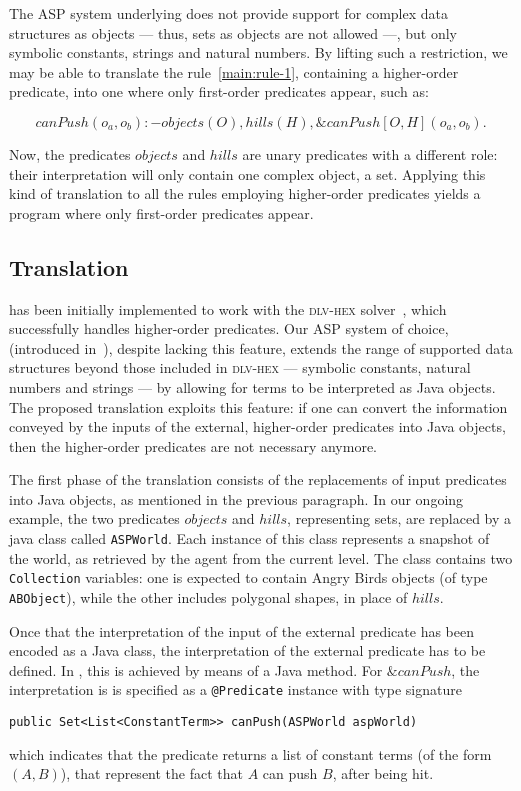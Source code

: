 The ASP system underlying \ah does not provide support for complex data structures as objects --- thus, sets as objects are not allowed ---, but only symbolic constants, strings and natural numbers.
By lifting such a restriction, we may be able to translate the rule~\eqref{main:rule-1}, containing a higher-order predicate, into one where only first-order predicates appear, such as:

$$ canPush(o_a,o_b) :- objects(O), hills(H), \&canPush[O,H](o_a,o_b). \label{main:rule-2} $$

Now, the predicates $objects$ and $hills$ are unary predicates with a different role: their interpretation will only contain one complex object, a set.
Applying this kind of translation to all the rules employing higher-order predicates yields a program where only first-order predicates appear.

\subsection{Translation}

\ah has been initially implemented to work with the \textsc{dlv-hex} solver~\cite{dlvHEX}, which successfully handles higher-order predicates.
Our ASP system of choice, \al (introduced in~\cite{blend}), despite lacking this feature, extends the range of supported data structures beyond those included in \textsc{dlv-hex} --- symbolic constants, natural numbers and strings --- by allowing for terms to be interpreted as Java objects.
The proposed translation exploits this feature: if one can convert the information conveyed by the inputs of the external, higher-order predicates into Java objects, then the higher-order predicates are not necessary anymore.

The first phase of the translation consists of the replacements of input predicates into Java objects, as mentioned in the previous paragraph.
In our ongoing example, the two predicates $objects$ and $hills$, representing sets, are replaced by a java class called \texttt{ASPWorld}.
Each instance of this class represents a snapshot of the world, as retrieved by the agent from the current level.
The class contains two \texttt{Collection} variables: one is expected to contain Angry Birds objects (of type \texttt{ABObject}), while the other includes polygonal shapes, in place of $hills$.

Once that the interpretation of the input of the external predicate has been encoded as a Java class, the interpretation of the external predicate has to be defined.
In \al, this is achieved by means of a Java method.
For $\&canPush$, the interpretation is  is specified as a \texttt{@Predicate} instance with type signature
\begin{center}
    \texttt{public Set<List<ConstantTerm>> canPush(ASPWorld aspWorld)}
\end{center}
which indicates that the predicate returns a list of constant terms (of the form \((A,B)\)), that represent the fact that \(A\) can push \(B\), after being hit.

